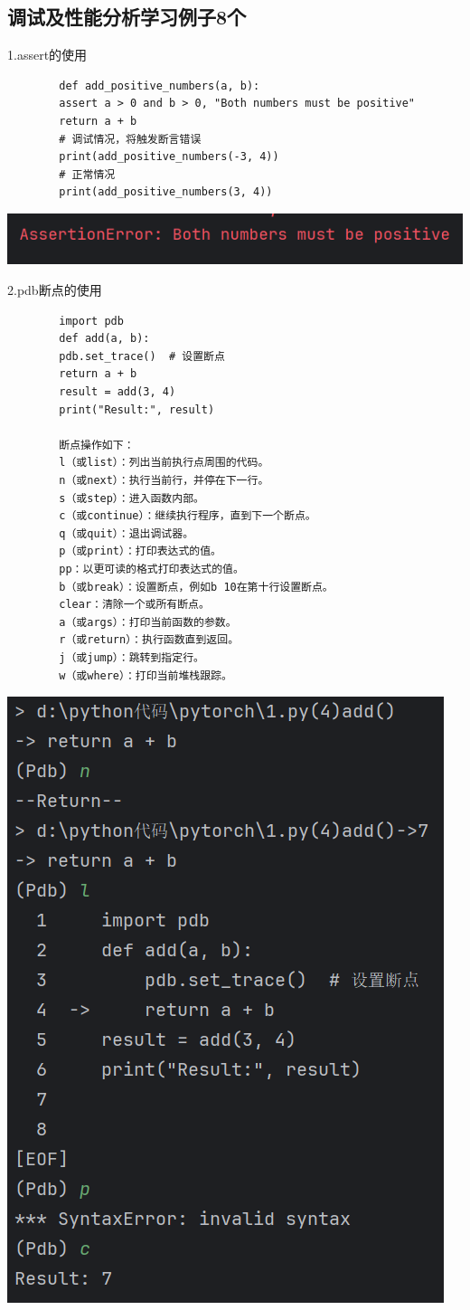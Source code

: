 \documentclass{article}
\begin{document}
	\subsection{调试及性能分析学习例子8个}
	
	1.assert的使用
	\begin{verbatim}
		def add_positive_numbers(a, b):
		assert a > 0 and b > 0, "Both numbers must be positive"
		return a + b
		# 调试情况，将触发断言错误
		print(add_positive_numbers(-3, 4))
		# 正常情况
		print(add_positive_numbers(3, 4))
	\end{verbatim}
	
	\noindent
	\begin{minipage}{\linewidth}
		\centering
		\includegraphics[width=0.5\linewidth]{example13.png}
		\label{fig:example}
	\end{minipage}
	
	2.pdb断点的使用
	\begin{verbatim}
		import pdb
		def add(a, b):
		pdb.set_trace()  # 设置断点
		return a + b
		result = add(3, 4)
		print("Result:", result)
		
		断点操作如下：
		l（或list）：列出当前执行点周围的代码。
		n（或next）：执行当前行，并停在下一行。
		s（或step）：进入函数内部。
		c（或continue）：继续执行程序，直到下一个断点。
		q（或quit）：退出调试器。
		p（或print）：打印表达式的值。
		pp：以更可读的格式打印表达式的值。
		b（或break）：设置断点，例如b 10在第十行设置断点。
		clear：清除一个或所有断点。
		a（或args）：打印当前函数的参数。
		r（或return）：执行函数直到返回。
		j（或jump）：跳转到指定行。
		w（或where）：打印当前堆栈跟踪。
	\end{verbatim}
	
	\noindent
	\begin{minipage}{\linewidth}
		\centering
		\includegraphics[width=0.5\linewidth]{example14.png}
		\label{fig:example}
	\end{minipage}
	
\end{document}
